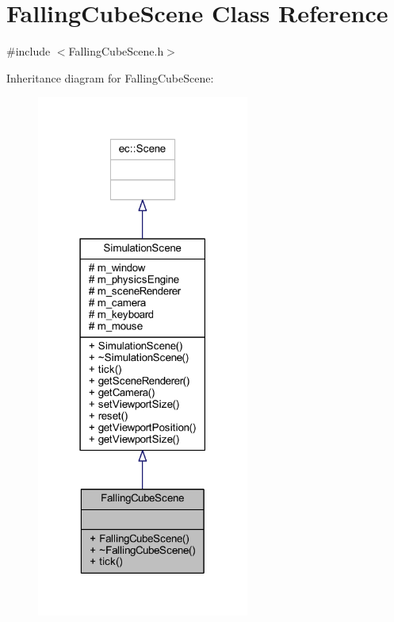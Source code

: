 \hypertarget{class_falling_cube_scene}{}\section{Falling\+Cube\+Scene Class Reference}
\label{class_falling_cube_scene}


{\ttfamily \#include $<$Falling\+Cube\+Scene.\+h$>$}



Inheritance diagram for Falling\+Cube\+Scene\+:\nopagebreak
\begin{figure}[H]
\begin{center}
\leavevmode
\includegraphics[width=198pt]{class_falling_cube_scene__inherit__graph}
\end{center}
\end{figure}


